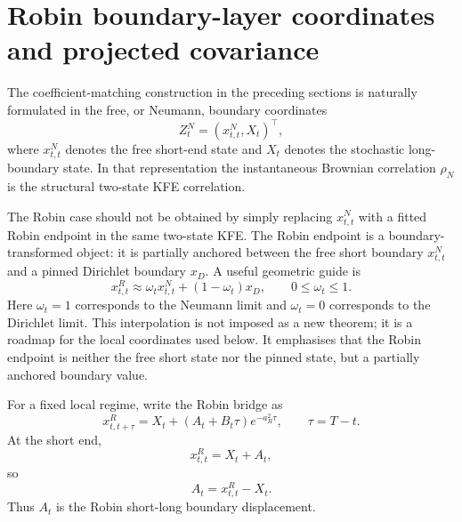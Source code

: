 \documentclass[11pt]{article}
\numberwithin{equation}{section}
\begin{document}
\section{Robin boundary-layer coordinates and projected covariance}

The coefficient-matching construction in the preceding sections is naturally formulated in the free, or Neumann, boundary coordinates
\[
        Z^N_t=(x^N_{t,t},X_t)^\top,
\]
where \(x^N_{t,t}\) denotes the free short-end state and \(X_t\) denotes the stochastic long-boundary state. In that representation the instantaneous Brownian correlation \(\rho_N\) is the structural two-state KFE correlation.

The Robin case should not be obtained by simply replacing \(x^N_{t,t}\) with a fitted Robin endpoint in the same two-state KFE. The Robin endpoint is a boundary-transformed object: it is partially anchored between the free short boundary \(x^N_{t,t}\) and a pinned Dirichlet boundary \(x_D\). A useful geometric guide is
\begin{equation}
\label{eq:robin-neumann-dirichlet-heuristic}
        x^R_{t,t}
        \approx
        \omega_t x^N_{t,t}+(1-\omega_t)x_D,
        \qquad 0\leq \omega_t\leq 1.
\end{equation}
Here \(\omega_t=1\) corresponds to the Neumann limit and \(\omega_t=0\) corresponds to the Dirichlet limit. This interpolation is not imposed as a new theorem; it is a roadmap for the local coordinates used below. It emphasises that the Robin endpoint is neither the free short state nor the pinned state, but a partially anchored boundary value.

For a fixed local regime, write the Robin bridge as
\begin{equation}
\label{eq:robin-bridge-local}
        x^R_{t,t+\tau}
        =
        X_t+\left(A_t+B_t\tau\right)e^{-a_R^2\tau},
        \qquad \tau=T-t.
\end{equation}
At the short end,
\begin{equation}
\label{eq:robin-short-end-A}
        x^R_{t,t}=X_t+A_t,
\end{equation}
so
\begin{equation}
\label{eq:A-def-robin-local}
        A_t=x^R_{t,t}-X_t.
\end{equation}
Thus \(A_t\) is the Robin short-long boundary displacement.
\end{document}
